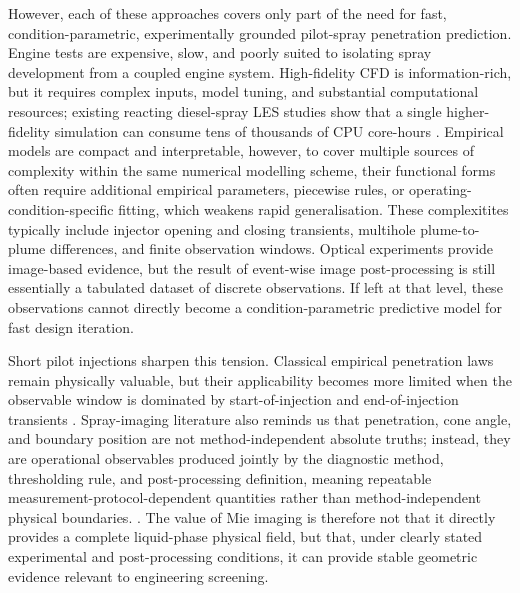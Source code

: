 However, each of these approaches covers only part of the need for fast, condition-parametric, experimentally grounded pilot-spray penetration prediction.
Engine tests are expensive, slow, and poorly suited to isolating spray development from a coupled engine system.
High-fidelity CFD is information-rich, but it requires complex inputs, model tuning, and substantial computational resources;
existing reacting diesel-spray LES studies show that a single higher-fidelity simulation can consume tens of thousands of CPU core-hours
\cite{CurtisNiemeyerSung2017,liu2020sprayreview}.
Empirical models are compact and interpretable, however, to cover multiple sources of complexity within the same numerical modelling scheme,
their functional forms often require additional empirical parameters, piecewise rules, or operating-condition-specific fitting,
which weakens rapid generalisation.
These complexitites typically include injector opening and closing transients, multihole plume-to-plume differences, and finite observation windows.
Optical experiments provide image-based evidence,
but the result of event-wise image post-processing is still essentially a tabulated dataset of discrete observations.
If left at that level, these observations cannot directly become a condition-parametric predictive model for fast design iteration.

Short pilot injections sharpen this tension.
Classical empirical penetration laws remain physically valuable,
but their applicability becomes more limited when the observable window is dominated by start-of-injection and end-of-injection transients
\cite{HiroyasuArai1990,ZhouLiYi2021,ZhouLiLaiWei2019}.
Spray-imaging literature also reminds us that penetration, cone angle, and boundary position are not method-independent absolute truths;
instead, they are operational observables produced jointly by the diagnostic method, thresholding rule, and post-processing definition,
meaning repeatable measurement-protocol-dependent quantities
rather than method-independent physical boundaries.
\cite{MagnottiGenzale2013,JohnsonNaberLee2012,ecn_liquid_penetration,ecn_liquid_penetration_accessory}.
The value of Mie imaging is therefore not that it directly provides a complete liquid-phase physical field,
but that, under clearly stated experimental and post-processing conditions,
it can provide stable geometric evidence relevant to engineering screening.


